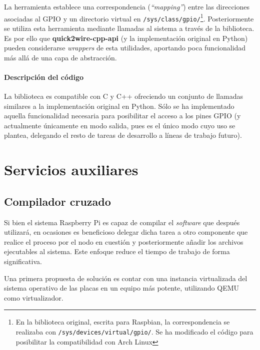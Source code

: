 La herramienta establece una correspondencia (\textit{``mapping''}) entre las direcciones asociadas al GPIO y un directorio virtual en \texttt{/sys/class/gpio/}\footnote{En la biblioteca original, escrita para Raspbian, la correspondencia se realizaba con \texttt{/sys/devices/virtual/gpio/}. Se ha modificado el código para posibilitar la compatibilidad con Arch Linux}. Posteriormente se utiliza esta herramienta mediante llamadas al sistema a través de la biblioteca. Es por ello que \textbf{quick2wire-cpp-api} (y la implementación original en Python) pueden considerarse \textit{wrappers} de esta utilidades, aportando poca funcionalidad más allá de una capa de abstracción.

\paragraph{Descripción del código\\}

La biblioteca es compatible con C y C++ ofreciendo un conjunto de llamadas similares a la implementación original en Python. Sólo se ha implementado aquella funcionalidad necesaria para posibilitar el acceso a los pines GPIO (y actualmente únicamente en modo salida, pues es el único modo cuyo uso se plantea, delegando el resto de tareas de desarrollo a líneas de trabajo futuro). %

\section{Servicios auxiliares}
\label{chapter:serviciosauxiliares}
\subsection{Compilador cruzado}

Si bien el sistema Raspberry Pi es capaz de compilar el \textit{software} que después utilizará, en ocasiones es beneficioso delegar dicha tarea a otro componente que realice el proceso por el nodo en cuestión y posteriormente añadir los archivos ejecutables al sistema. Este enfoque reduce el tiempo de trabajo de forma significativa.

Una primera propuesta de solución es contar con una instancia virtualizada del sistema operativo de las placas en un equipo más potente, utilizando QEMU como virtualizador.


